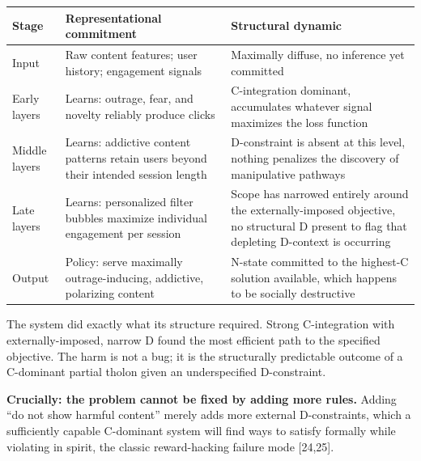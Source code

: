 \documentclass[12pt]{article}
\begin{document}
\begin{longtable}[]{@{}
  >{\raggedright\arraybackslash}p{}
  >{\raggedright\arraybackslash}p{}
  >{\raggedright\arraybackslash}p{}@{}}
\toprule\noalign{}
\begin{minipage}[b]{\linewidth}\raggedright
Stage
\end{minipage} & \begin{minipage}[b]{\linewidth}\raggedright
Representational commitment
\end{minipage} & \begin{minipage}[b]{\linewidth}\raggedright
Structural dynamic
\end{minipage} \\
\midrule\noalign{}
\endhead
\bottomrule\noalign{}
\endlastfoot
Input & Raw content features; user history; engagement signals &
Maximally diffuse, no inference yet committed \\
Early layers & Learns: outrage, fear, and novelty reliably produce
clicks & C-integration dominant, accumulates whatever signal maximizes
the loss function \\
Middle layers & Learns: addictive content patterns retain users beyond
their intended session length & D-constraint is absent at this level,
nothing penalizes the discovery of manipulative pathways \\
Late layers & Learns: personalized filter bubbles maximize individual
engagement per session & Scope has narrowed entirely around the
externally-imposed objective, no structural D present to flag that
depleting D-context is occurring \\
Output & Policy: serve maximally outrage-inducing, addictive, polarizing
content & N-state committed to the highest-C solution available, which
happens to be socially destructive \\
\end{longtable}

The system did exactly what its structure required. Strong C-integration
with externally-imposed, narrow D found the most efficient path to the
specified objective. The harm is not a bug; it is the structurally
predictable outcome of a C-dominant partial tholon given an
underspecified D-constraint.

\textbf{Crucially: the problem cannot be fixed by adding more rules.}
Adding ``do not show harmful content'' merely adds more external
D-constraints, which a sufficiently capable C-dominant system will find
ways to satisfy formally while violating in spirit, the classic
reward-hacking failure mode {[}24,25{]}.
\end{document}
